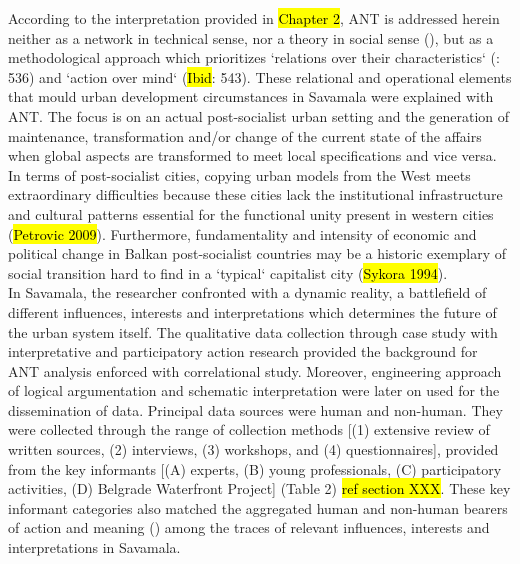 \documentclass[11pt]{report}
\begin{document}
According to the interpretation provided in \hl{Chapter 2}, ANT is addressed herein neither as a network in technical sense, nor a theory in social sense (\cite{Latour 1996}), but as a methodological approach which prioritizes  `relations over their characteristics` (\cite{Cerulo 2009}: 536) and `action over mind` (\hl{Ibid}: 543). These relational and operational elements that mould urban development circumstances in Savamala were explained with ANT. The focus is on an actual post-socialist urban setting and the generation of maintenance, transformation and/or change of the current state of the affairs when global aspects are transformed to meet local specifications and vice versa. In terms of post-socialist cities, copying urban models from the West meets extraordinary difficulties because these cities lack the institutional infrastructure and cultural patterns essential for the functional unity present in western cities (\hl{Petrovic 2009}). Furthermore, fundamentality and intensity of economic and political change in Balkan post-socialist countries may be a historic exemplary of social transition hard to find in a `typical` capitalist city (\hl{Sykora 1994}).
\\
In Savamala, the researcher confronted with a dynamic reality, a battlefield of different influences, interests and interpretations which determines the future of the urban system itself. The qualitative data collection through case study with interpretative and participatory action research provided the background for ANT analysis enforced with correlational study. Moreover, engineering approach of logical argumentation and schematic interpretation were later on used for the dissemination of data. Principal data sources were human and non-human. They were collected through the range of collection methods [(1) extensive review of written sources, (2) interviews, (3) workshops, and (4) questionnaires], provided from the key informants [(A) experts, (B) young professionals, (C) participatory activities, (D) Belgrade Waterfront Project] (Table 2) \hl{ref section XXX}. These key informant categories also matched the aggregated human and non-human bearers of action and meaning (\cite{Latour 2005}) among the traces of relevant influences, interests and interpretations in Savamala.
\\
\end{document}
